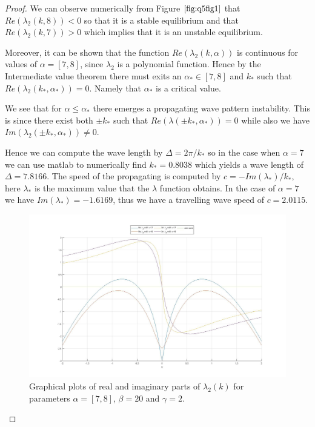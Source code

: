 \documentclass[11pt]{article}
\theoremstyle{quest}
\begin{document}
\begin{proof}
    We can observe numerically from Figure $\ref{fig:q5fig1}$ that $Re( \lambda_2 (k, 8) ) < 0 $ so that it is a stable equilibrium 
    and that $Re( \lambda_2 (k, 7) ) > 0$ which implies that it is an unstable equilibrium.
    
    Moreover, it can be shown that the function $Re( \lambda_2 (k, \alpha) )$ is continuous for values of
    $\alpha = [7,8]$, since $\lambda_2$ is a polynomial function. Hence by the Intermediate value theorem
    there must exits an $\alpha_* \in [7,8] $ and $k_*$ such that $Re( \lambda_2 (k_*, \alpha_* ) ) = 0$. 
    Namely that $\alpha_*$ is a critical value.

    We see that for $\alpha \leq \alpha_*$ there emerges a propagating wave pattern instability.
    This is since there exist both $\pm k_*$ such that $Re(\lambda(\pm k_* , \alpha_*)) =0 $ while 
    also we have $Im(\lambda_2(\pm k_* , \alpha_*)) \neq 0$.
    
    Hence we can compute the wave length by $ \Delta = 2 \pi / k_*$ so in the case when $\alpha =7$ 
    we can use matlab to numerically find $k_* = 0.8038$ which yields a wave length of $ \Delta = 7.8166$.
    The speed of the propagating is computed by $ c = - Im(\lambda_*) / k_*$, here $\lambda_*$ is the maximum
    value that the $\lambda$ function obtains. In the case of $\alpha =7$ we have
    $Im(\lambda_*)= -1.6169$, thus we have a travelling wave speed of $c = 2.0115$.

    \begin{figure}[h!]
        \includegraphics[width=\linewidth]{figures/Q5_fig1.jpg}
        \caption{Graphical plots of real and imaginary parts of $\lambda_2 (k)$ for parameters $\alpha=[7,8]$,
        $\beta =20$ and $\gamma =2$.}
        \label{fig:q5fig1}
    \end{figure}

     
    
\end{proof}
\clearpage
\end{document}
